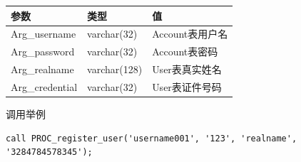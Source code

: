 \documentclass[]{article}
\begin{document}
\begin{longtable}[]{@{}lll@{}}
\toprule
参数 & 类型 & 值\tabularnewline
\midrule
\endhead
Arg\_username & varchar(32) & Account表用户名\tabularnewline
Arg\_password & varchar(32) & Account表密码\tabularnewline
Arg\_realname & varchar(128) & User表真实姓名\tabularnewline
Arg\_credential & varchar(32) & User表证件号码\tabularnewline
\bottomrule
\end{longtable}

调用举例

\begin{verbatim}
call PROC_register_user('username001', '123', 'realname', '3284784578345');
\end{verbatim}
\end{document}
